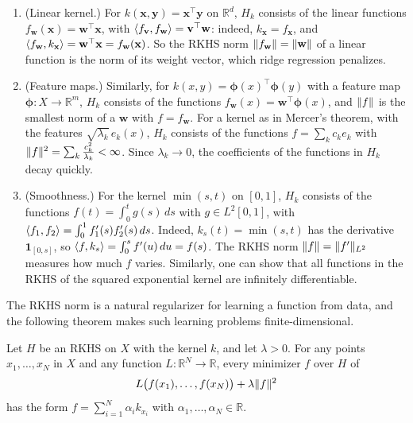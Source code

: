 \begin{example}\label{A-ex:rkhs}
    \begin{enumerate}
        \item (Linear kernel.) For $k(\mathbf{x}, \mathbf{y}) = \mathbf{x}^\top\mathbf{y}$ on $\mathbb{R}^d$, $H_k$ consists of the linear functions $f_{\mathbf{w}}(\mathbf{x}) = \mathbf{w}^\top\mathbf{x}$, with $\langle f_{\mathbf{v}}, f_{\mathbf{w}} \rangle = \mathbf{v}^\top\mathbf{w}$: indeed, $k_{\mathbf{x}} = f_{\mathbf{x}}$, and $\langle f_{\mathbf{w}}, k_{\mathbf{x}} \rangle = \mathbf{w}^\top\mathbf{x} = f_{\mathbf{w}}(\mathbf{x})$. So the RKHS norm $\lVert f_{\mathbf{w}} \rVert = \lVert \mathbf{w} \rVert$ of a linear function is the norm of its weight vector, which ridge regression penalizes.
        \item (Feature maps.) Similarly, for $k(x, y) = \boldsymbol{\phi}(x)^\top\boldsymbol{\phi}(y)$ with a feature map $\boldsymbol{\phi}: X \to \mathbb{R}^m$, $H_k$ consists of the functions $f_{\mathbf{w}}(x) = \mathbf{w}^\top\boldsymbol{\phi}(x)$, and $\lVert f \rVert$ is the smallest norm of a $\mathbf{w}$ with $f = f_{\mathbf{w}}$. For a kernel as in Mercer's theorem, with the features $\sqrt{\lambda_k}\,e_k(x)$, $H_k$ consists of the functions $f = \sum_k c_ke_k$ with $\lVert f \rVert^2 = \sum_k \frac{c_k^2}{\lambda_k} < \infty$. Since $\lambda_k \to 0$, the coefficients of the functions in $H_k$ decay quickly.
        \item (Smoothness.) For the kernel $\min(s, t)$ on $[0, 1]$, $H_k$ consists of the functions $f(t) = \int_0^t g(s)\, ds$ with $g \in L^2[0, 1]$, with $\langle f_1, f_2 \rangle = \int_0^1 f_1'(s)f_2'(s)\, ds$. Indeed, $k_s(t) = \min(s, t)$ has the derivative $\mathbf{1}_{[0, s]}$, so $\langle f, k_s \rangle = \int_0^s f'(u)\, du = f(s)$. The RKHS norm $\lVert f \rVert = \lVert f' \rVert_{L^2}$ measures how much $f$ varies. Similarly, one can show that all functions in the RKHS of the squared exponential kernel are infinitely differentiable.
    \end{enumerate}
\end{example}

The RKHS norm is a natural regularizer for learning a function from data, and the following theorem makes such learning problems finite-dimensional.

\begin{theorem}\label{A-thm:representer}
    Let $H$ be an RKHS on $X$ with the kernel $k$, and let $\lambda > 0$. For any points $x_1, \ldots, x_N$ in $X$ and any function $L: \mathbb{R}^N \to \mathbb{R}$, every minimizer $f$ over $H$ of
    \[L\big(f(x_1), \ldots, f(x_N)\big) + \lambda\lVert f \rVert^2\]
    has the form $f = \sum_{i=1}^N \alpha_ik_{x_i}$ with $\alpha_1, \ldots, \alpha_N \in \mathbb{R}$.
\end{theorem}

